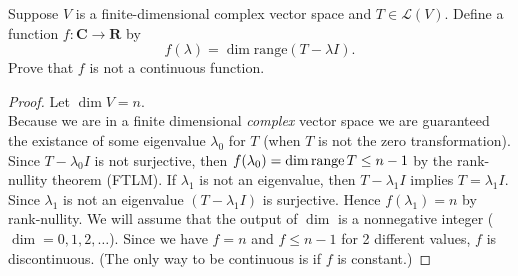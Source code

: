 Suppose $V$ is a finite-dimensional complex vector space and $T \in \mathcal{L}(V)$.  Define a function $f: \mathbf{C} \to \mathbf{R}$ by
    \[
        f(\lambda) = \dim \text{range}(T- \lambda I).
    \]
    Prove that $f$ is not a continuous function.
    \begin{mybox}
        \begin{proof}
            Let $\dim V = n$. \\Because we are in a finite dimensional \textit{complex} vector space we are guaranteed the existance of some eigenvalue $\lambda_0$ for $T$ (when $T$ is not the zero transformation). Since $T-\lambda_0 I$ is not surjective, then $f(\lambda_0) = \operatorname{dim}\operatorname{range}{T} \leq n-1$ by the rank-nullity theorem (FTLM). If $\lambda_1$ is not an eigenvalue, then $T - \lambda_1 I$ implies $T = \lambda_1 I$. Since $\lambda_1$ is not an eigenvalue $(T-\lambda_1 I)$ is surjective. Hence $f(\lambda_1) = n$ by rank-nullity. We will assume that the output of $\dim$ is a nonnegative integer ($\operatorname{dim} = 0, 1, 2, \dots$). Since we have $f = n$ and $f \leq n-1$ for 2 different values, $f$ is discontinuous. (The only way to be continuous is if $f$ is constant.)  %
    \end{proof}
    \end{mybox}